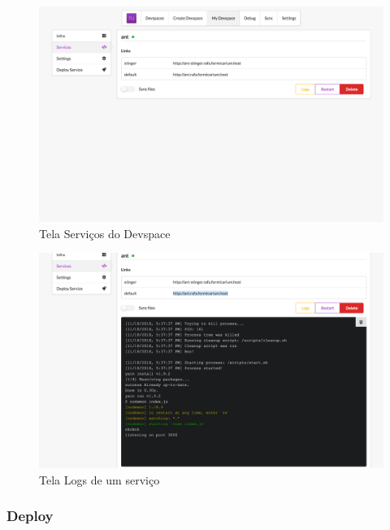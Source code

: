     \begin{figure}[htb]
    	\caption{\label{fig_frontend_devspace_services}Tela Serviços do Devspace}
    	\begin{center}
    	\includegraphics[width=\textwidth,keepaspectratio]{pictures/frontend/frontend-devspace-services.png}
    	\end{center}
    \end{figure}
    
    \begin{figure}[htb]
    	\caption{\label{fig_frontend_logs}Tela Logs de um serviço}
    	\begin{center}
    	\includegraphics[width=\textwidth,keepaspectratio]{pictures/frontend/frontend-logs.png}
    	\end{center}
    \end{figure}

        \subsubsection{Deploy}

